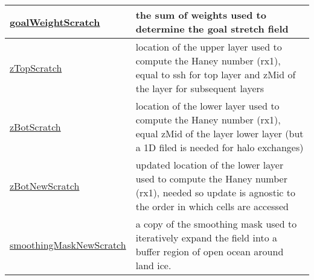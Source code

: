 {\begin{center}
\begin{longtable}{| p{2.0in} | p{4.0in} |}
    \hline
    \hyperref[subsec:var_sec_scratch_goalWeightScratch]{goalWeightScratch} & the sum of weights used to determine the goal stretch field \\
    \hline
    \hyperref[subsec:var_sec_scratch_zTopScratch]{zTopScratch} & location of the upper layer used to compute the Haney number (rx1), equal to ssh for top layer and zMid of the layer for subsequent layers \\
    \hline
    \hyperref[subsec:var_sec_scratch_zBotScratch]{zBotScratch} & location of the lower layer used to compute the Haney number (rx1), equal zMid of the layer lower layer (but a 1D filed is needed for halo exchanges) \\
    \hline
    \hyperref[subsec:var_sec_scratch_zBotNewScratch]{zBotNewScratch} & updated location of the lower layer used to compute the Haney number (rx1), needed so update is agnostic to the order in which cells are accessed \\
    \hline
    \hyperref[subsec:var_sec_scratch_smoothingMaskNewScratch]{smoothingMaskNewScratch} & a copy of the smoothing mask used to iteratively expand the field into a buffer region of open ocean around land ice. \\
    \hline
\end{longtable}
\end{center}
}
